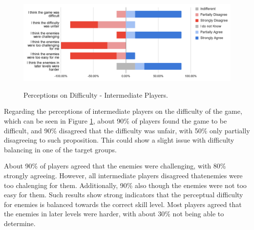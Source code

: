 
\begin{figure}[!ht]
    \begin{center}
    \caption{Perceptions on Difficulty - Intermediate Players.}
        \includegraphics[width=36em]{figures/fig-perception-difficulty-intermediate-players.png}
        \label{fig:perception-difficulty-intermediate-players}
    \end{center}
\end{figure}

Regarding the perceptions of intermediate players on the difficulty of the game, which can be seen in Figure \ref{fig:perception-difficulty-intermediate-players}, about 90\% of players found the game to be difficult, and 90\% disagreed that the difficulty was unfair, with 50\% only partially disagreeing to such proposition. This could show a slight issue with difficulty balancing in one of the target groups.

About 90\% of players agreed that the enemies were challenging, with 80\% strongly agreeing. However, all intermediate players disagreed thatenemies were too chalenging for them. Additionally, 90\% also though the enemies were not too easy for them. Such results show strong indicators that the perceptual difficulty for enemies is balanced towards the correct skill level. Most players agreed that the enemies in later levels were harder, with about 30\% not being able to determine.

